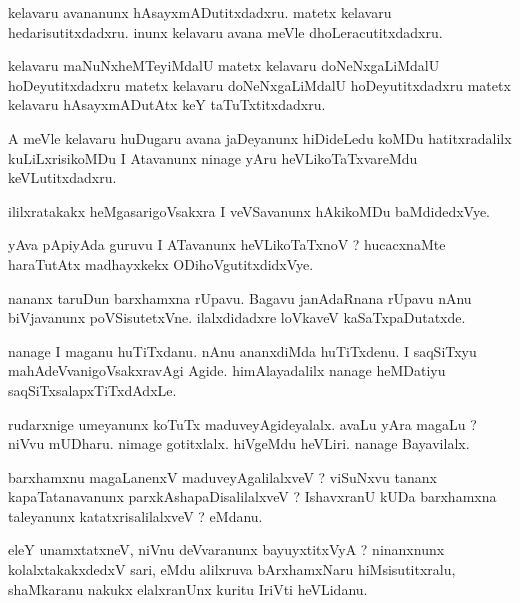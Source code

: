 \documentclass{article}
\begin{document}
\begin{mn}
kelavaru avananunx hAsayxmADutitxdadxru.  matetx kelavaru hedarisutitxdadxru.  
inunx kelavaru  avana meVle dhoLeracutitxdadxru.
\end{mn}

\begin{mn}
kelavaru maNuNxheMTeyiMdalU  matetx kelavaru doNeNxgaLiMdalU hoDeyutitxdadxru matetx kelavaru 
doNeNxgaLiMdalU hoDeyutitxdadxru  matetx kelavaru hAsayxmADutAtx keY taTuTxtitxdadxru. 
\end{mn}

\begin{mn}
A meVle kelavaru huDugaru  avana jaDeyanunx  hiDideLedu koMDu hatitxradalilx 
kuLiLxrisikoMDu I Atavanunx ninage yAru heVLikoTaTxvareMdu keVLutitxdadxru.
\end{mn}

\begin{mn}
ililxratakakx  heMgasarigoVsakxra  I  veVSavanunx hAkikoMDu baMdidedxVye.
\end{mn}

\begin{mn}
yAva pApiyAda guruvu I ATavanunx  heVLikoTaTxnoV ?  hucacxnaMte haraTutAtx madhayxkekx ODihoVgutitxdidxVye.
\end{mn}

\begin{mn}
nananx taruDun  barxhamxna rUpavu.  Bagavu  janAdaRnana  rUpavu  nAnu biVjavanunx 
poVSisutetxVne.  ilalxdidadxre loVkaveV kaSaTxpaDutatxde.
\end{mn}

\begin{mn}
nanage I maganu  huTiTxdanu.  nAnu ananxdiMda huTiTxdenu.  I saqSiTxyu  mahAdeVvanigoVsakxravAgi  
Agide.  himAlayadalilx nanage heMDatiyu  saqSiTxsalapxTiTxdAdxLe.
\end{mn}

\begin{mn}
rudarxnige umeyanunx koTuTx maduveyAgideyalalx.  avaLu yAra magaLu ?  niVvu mUDharu.  
nimage  gotitxlalx.  hiVgeMdu heVLiri. nanage Bayavilalx.
\end{mn}

\begin{mn}
barxhamxnu magaLanenxV maduveyAgalilalxveV ?  viSuNxvu  tananx kapaTatanavanunx  parxkAshapaDisalilalxveV ?  
IshavxranU  kUDa barxhamxna taleyanunx katatxrisalilalxveV ?  eMdanu.
\end{mn}

\begin{mn}
eleY unamxtatxneV,  niVnu deVvaranunx  bayuyxtitxVyA ?  ninanxnunx kolalxtakakxdedxV sari, eMdu 
alilxruva bArxhamxNaru  hiMsisutitxralu,  shaMkaranu nakukx elalxranUnx kuritu IriVti heVLidanu.
\end{mn}
\end{document}
